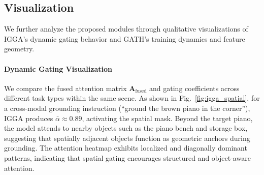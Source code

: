 \documentclass[lettersize,journal]{IEEEtran}
\begin{document}

\subsection{Visualization}

We further analyze the proposed modules through qualitative visualizations of IGGA's dynamic gating behavior and GATH's {training dynamics and feature geometry.}

\paragraph*{Dynamic Gating Visualization} We compare the fused attention matrix $\mathbf{A}_{\text{fused}}$ and gating coefficients across different task types within the same scene. As shown in Fig.~\ref{fig:igga_spatial}, for a cross-modal grounding instruction (``ground the brown piano in the corner''), IGGA produces $\bar{\alpha} \approx 0.89$, activating the spatial mask. Beyond the target piano, the model attends to nearby objects such as the piano bench and storage box, suggesting that spatially adjacent objects function as geometric anchors during grounding. The attention heatmap exhibits localized and diagonally dominant patterns, indicating that spatial gating encourages structured and object-aware attention.
\end{document}
